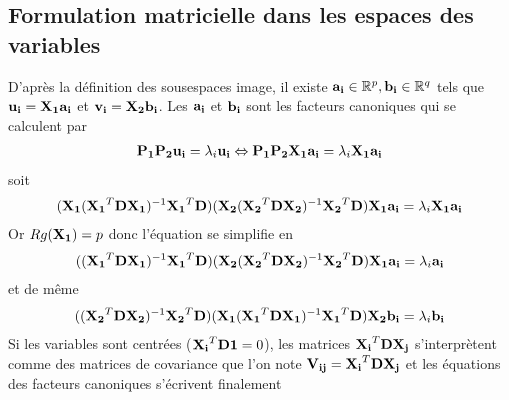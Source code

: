 \documentclass[letterpaper,10pt,french]{sphinxmanual}
\begin{document}
\subsection{Formulation matricielle dans les espaces des variables}
\label{\detokenize{canonique:formulation-matricielle-dans-les-espaces-des-variables}}
\sphinxAtStartPar
D’après la définition des sous\sphinxhyphen{}espaces image, il existe \({\bf a_i}\in\mathbb{R}^p,{\bf b_i}\in\mathbb{R}^q\) tels que  \({\bf u_i}={\bf {\bf X_1}}{\bf a_i}\) et \({\bf v_i}={\bf {\bf X_2}}{\bf b_i}\). Les \({\bf a_i}\) et \({\bf b_i}\) sont les facteurs canoniques qui se calculent par
\begin{equation*}
\begin{split}{\bf P_1}{\bf P_2}{\bf u_i}=\lambda_i {\bf u_i} \Leftrightarrow {\bf P_1}{\bf P_2}{\bf X_1}{\bf a_i}=\lambda_i {\bf X_1} {\bf a_i}\end{split}
\end{equation*}
\sphinxAtStartPar
soit
\begin{equation*}
\begin{split}({\bf X_1}({\bf X_1}^T{\bf D}{\bf X_1})^{-1}{\bf X_1}^T{\bf D})({\bf X_2}({\bf X_2}^T{\bf D}{\bf X_2})^{-1}{\bf X_2}^T{\bf D}){\bf X_1}{\bf a_i}=\lambda_i {\bf X_1} {\bf a_i}\end{split}
\end{equation*}
\sphinxAtStartPar
Or \(Rg({\bf X_1})=p\) donc l’équation se simplifie en
\begin{equation*}
\begin{split}(({\bf X_1}^T{\bf D}{\bf X_1})^{-1}{\bf X_1}^T{\bf D})({\bf X_2}({\bf X_2}^T{\bf D}{\bf X_2})^{-1}{\bf X_2}^T{\bf D}){\bf X_1}{\bf a_i}=\lambda_i {\bf a_i}\end{split}
\end{equation*}
\sphinxAtStartPar
et de même
\begin{equation*}
\begin{split}(({\bf X_2}^T{\bf D}{\bf X_2})^{-1}{\bf X_2}^T{\bf D})({\bf X_1}({\bf X_1}^T{\bf D}{\bf X_1})^{-1}{\bf X_1}^T{\bf D}){\bf X_2}{\bf b_i}=\lambda_i {\bf b_i}\end{split}
\end{equation*}
\sphinxAtStartPar
Si les variables sont centrées (\({\bf {\bf X_i}}^T{\bf D}{\bf 1} = 0\)), les matrices \({\bf {\bf X_i}}^T{\bf D}{\bf X_j}\) s’interprètent comme des matrices de covariance que l’on note \({\bf V_{ij}} = {\bf {\bf X_i}}^T{\bf D}{\bf X_j}\) et les équations des facteurs canoniques s’écrivent finalement
\end{document}
